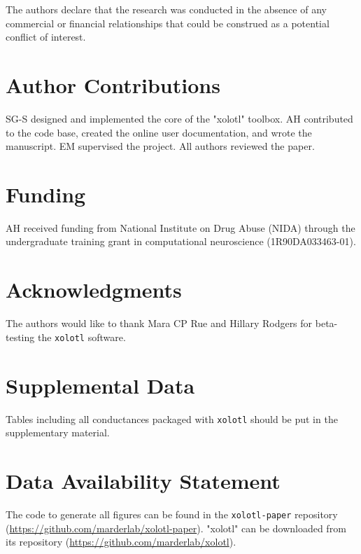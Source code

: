 \documentclass{frontiersSCNS} %
\begin{document}
The authors declare that the research was conducted in the absence of any commercial or financial relationships that could be construed as a potential conflict of interest.

\section*{Author Contributions}

SG-S designed and implemented the core of the "xolotl" toolbox. AH contributed to the code base, created the online user documentation, and wrote the manuscript. EM supervised the project. All authors reviewed the paper.

\section*{Funding}

AH received funding from National Institute on Drug Abuse (NIDA) through the undergraduate training grant in computational neuroscience (1R90DA033463-01).

\section*{Acknowledgments}
The authors would like to thank Mara CP Rue and Hillary Rodgers for beta-testing the \texttt{xolotl} software.

\section*{Supplemental Data}
Tables including all conductances packaged with \texttt{xolotl} should be put in the supplementary material.

\section*{Data Availability Statement}

The code to generate all figures can be found in the \texttt{xolotl-paper} repository (\url{https://github.com/marderlab/xolotl-paper}). "xolotl" can be downloaded from its repository (\url{https://github.com/marderlab/xolotl}).

%
%
%
%
%
%

\printbibliography
\end{document}

